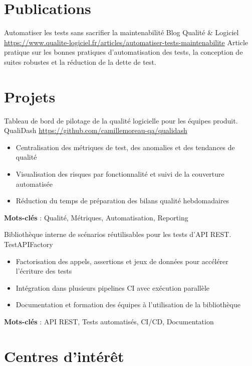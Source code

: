 \documentclass[a4paper, serif, 10pt]{moderncv}
\begin{document}
\section{Publications}

        {Automatiser les tests sans sacrifier la maintenabilité}
        {Blog Qualité \& Logiciel}
        {\url{https://www.qualite-logiciel.fr/articles/automatiser-tests-maintenabilite}}
        {}
        {Article pratique sur les bonnes pratiques d'automatisation des tests, la conception de suites robustes et la réduction de la dette de test.}
\section{Projets}

        {Tableau de bord de pilotage de la qualité logicielle pour les équipes produit.}
        {QualiDash}
        {\url{https://github.com/camillemoreau-qa/qualidash}}
        {}
        {\begin{itemize}
\item Centralisation des métriques de test, des anomalies et des tendances de qualité
\item Visualisation des risques par fonctionnalité et suivi de la couverture automatisée
\item Réduction du temps de préparation des bilans qualité hebdomadaires
\end{itemize}
\textbf{Mots-clés} : Qualité, Métriques, Automatisation, Reporting}

        {Bibliothèque interne de scénarios réutilisables pour les tests d'API REST.}
        {TestAPIFactory}
        {}
        {}
        {\begin{itemize}
\item Factorisation des appels, assertions et jeux de données pour accélérer l'écriture des tests
\item Intégration dans plusieurs pipelines CI avec exécution parallèle
\item Documentation et formation des équipes à l'utilisation de la bibliothèque
\end{itemize}
\textbf{Mots-clés} : API REST, Tests automatisés, CI/CD, Documentation}
\section{Centres d'intérêt}

\end{document}
